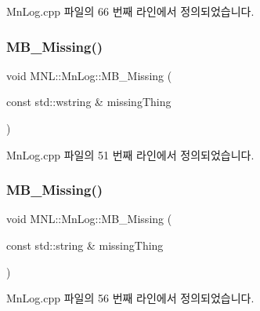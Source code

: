 Mn\+Log.\+cpp 파일의 66 번째 라인에서 정의되었습니다.

\mbox{\label{namespace_m_n_l_1_1_mn_log_aa4b3b0b3a1d53be57a16e07df8ba355b}} 
\subsubsection{\texorpdfstring{M\+B\+\_\+\+Missing()}{MB\_Missing()}\hspace{0.1cm}{\footnotesize\ttfamily [1/2]}}
{\footnotesize\ttfamily void M\+N\+L\+::\+Mn\+Log\+::\+M\+B\+\_\+\+Missing (\begin{DoxyParamCaption}\item[{const std\+::wstring \&}]{missing\+Thing }\end{DoxyParamCaption})}



Mn\+Log.\+cpp 파일의 51 번째 라인에서 정의되었습니다.

\mbox{\label{namespace_m_n_l_1_1_mn_log_aa33a76c4a666f9d43e4c86a0bb4e7337}} 
\subsubsection{\texorpdfstring{M\+B\+\_\+\+Missing()}{MB\_Missing()}\hspace{0.1cm}{\footnotesize\ttfamily [2/2]}}
{\footnotesize\ttfamily void M\+N\+L\+::\+Mn\+Log\+::\+M\+B\+\_\+\+Missing (\begin{DoxyParamCaption}\item[{const std\+::string \&}]{missing\+Thing }\end{DoxyParamCaption})}



Mn\+Log.\+cpp 파일의 56 번째 라인에서 정의되었습니다.

